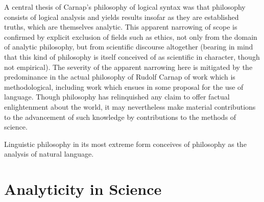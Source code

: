 A central thesis of Carnap's philosophy of logical syntax was that
philosophy consists of logical analysis and yields results insofar as
they are established truths, which are themselves analytic.
This apparent narrowing of scope is confirmed by explicit exclusion of
fields such as ethics, not only from the domain of analytic
philosophy, but from scientific discourse altogether (bearing in mind
that this kind of philosophy is itself conceived of as scientific in
character, though not empirical).
The severity of the apparent narrowing here is mitigated by the
predominance in the actual philosophy of Rudolf Carnap of work which
is methodological, including work which ensues in some proposal for
the use of language.
Though philosophy has relinquished any claim to offer factual
enlightenment about the world, it may nevertheless make material
contributions to the advancement of such knowledge by contributions to
the methods of science.

Linguistic philosophy in its most extreme form conceives of philosophy
as the analysis of natural language.


\section{Analyticity in Science}

